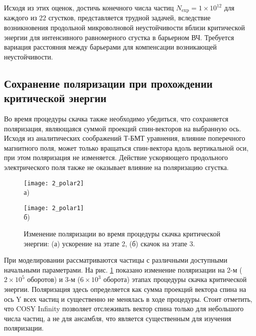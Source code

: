 \par Исходя из этих оценок, достичь конечного числа частиц $N_{\textrm{exp}}=1\times10^{12}$ для каждого из $22$ сгустков, представляется трудной задачей, вследствие возникновения продольной микроволновой неустойчивости вблизи критической энергии для интенсивного равномерного сгустка в барьерном ВЧ. Требуется вариация расстояния между барьерами для компенсации возникающей	неустойчивости.

	\subsection{Сохранение поляризации при прохождении критической энергии}\label{subsec:transition_jump/regular/polarization}

\par Во время процедуры скачка также необходимо убедиться, что сохраняется поляризация, являющаяся суммой проекций спин-векторов на выбранную ось. Исходя из аналитических соображений Т-БМТ уравнения, влияние поперечного магнитного поля, может только вращаться спин-вектора вдоль вертикальной оси, при этом поляризация не изменяется. Действие ускоряющего продольного электрического поля также не оказывает влияние на поляризацию сгустка.

\begin{figure}[!h]    
    \begin{minipage}[b][][b]{0.49\linewidth}\centering
        \texttt{[image: 2\_polar2]} \\ а)
    \end{minipage}
    \hfill
    \begin{minipage}[b][][b]{0.49\linewidth}\centering
        \texttt{[image: 2\_polar1]} \\ б)
    \end{minipage}
    \caption{Изменение поляризации во время процедуры скачка критической энергии: (а) ускорение на этапе 2, (б) скачок на этапе 3.}
    \label{fig:polar}
\end{figure}

\par При моделировании рассматриваются частицы с различными доступными начальными параметрами. На рис. \ref{fig:polar} показано изменение поляризации на 2-м ($2\times10^5$ оборотов) и 3-м ($6\times10^3$ оборота) этапах процедуры скачка критической энергии. Поляризация здесь определяется как сумма проекций вектора спина на ось Y всех частиц и существенно не менялась в ходе процедуры. Стоит отметить, что COSY Infinity позволяет отслеживать вектор спина только для небольшого числа частиц, а не для ансамбля, что является существенным для изучения поляризации.

